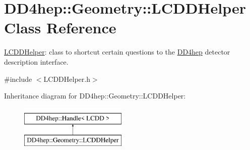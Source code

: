 \hypertarget{class_d_d4hep_1_1_geometry_1_1_l_c_d_d_helper}{}\section{D\+D4hep\+:\+:Geometry\+:\+:L\+C\+D\+D\+Helper Class Reference}
\label{class_d_d4hep_1_1_geometry_1_1_l_c_d_d_helper}


\hyperlink{class_d_d4hep_1_1_geometry_1_1_l_c_d_d_helper}{L\+C\+D\+D\+Helper}\+: class to shortcut certain questions to the \hyperlink{namespace_d_d4hep}{D\+D4hep} detector description interface.  




{\ttfamily \#include $<$L\+C\+D\+D\+Helper.\+h$>$}

Inheritance diagram for D\+D4hep\+:\+:Geometry\+:\+:L\+C\+D\+D\+Helper\+:\begin{figure}[H]
\begin{center}
\leavevmode
\includegraphics[height=2.000000cm]{class_d_d4hep_1_1_geometry_1_1_l_c_d_d_helper}
\end{center}
\end{figure}
